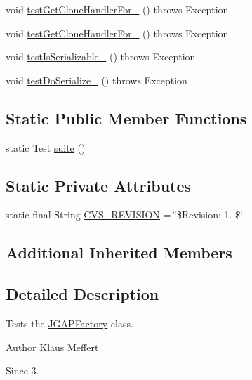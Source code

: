 \begin{DoxyCompactItemize}
\item 
void \hyperlink{classorg_1_1jgap_1_1impl_1_1_j_g_a_p_factory_test_a16f86a2f6bec85e54fc7f410fb352d26}{test\-Get\-Clone\-Handler\-For\-\_} ()  throws Exception 
\item 
void \hyperlink{classorg_1_1jgap_1_1impl_1_1_j_g_a_p_factory_test_a9d0bd03cb5160f3ad8d1c1c0eaa2473a}{test\-Get\-Clone\-Handler\-For\-\_} ()  throws Exception 
\item 
void \hyperlink{classorg_1_1jgap_1_1impl_1_1_j_g_a_p_factory_test_add9663f08a1cd8a8536dc1044668fbfd}{test\-Is\-Serializable\-\_} ()  throws Exception 
\item 
void \hyperlink{classorg_1_1jgap_1_1impl_1_1_j_g_a_p_factory_test_af98823f52d9291772561040d57f35853}{test\-Do\-Serialize\-\_} ()  throws Exception 
\end{DoxyCompactItemize}
\subsection*{Static Public Member Functions}
\begin{DoxyCompactItemize}
\item 
static Test \hyperlink{classorg_1_1jgap_1_1impl_1_1_j_g_a_p_factory_test_a26cc663e6d4492916fcf04545f1ffadf}{suite} ()
\end{DoxyCompactItemize}
\subsection*{Static Private Attributes}
\begin{DoxyCompactItemize}
\item 
static final String \hyperlink{classorg_1_1jgap_1_1impl_1_1_j_g_a_p_factory_test_af0690b96d231254944716670742b2148}{C\-V\-S\-\_\-\-R\-E\-V\-I\-S\-I\-O\-N} = \char`\"{}\$Revision\-: 1. \$\char`\"{}
\end{DoxyCompactItemize}
\subsection*{Additional Inherited Members}


\subsection{Detailed Description}
Tests the \hyperlink{classorg_1_1jgap_1_1impl_1_1_j_g_a_p_factory}{J\-G\-A\-P\-Factory} class.

\begin{DoxyAuthor}{Author}
Klaus Meffert 
\end{DoxyAuthor}
\begin{DoxySince}{Since}
3. 
\end{DoxySince}


